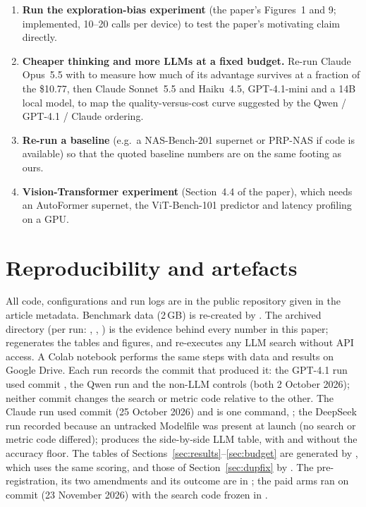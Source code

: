 \begin{enumerate}
  \item \textbf{Run the exploration-bias experiment} (the paper's Figures~1 and 9; implemented, 10--20 calls per device) to test the paper's motivating claim directly.
  \item \textbf{Cheaper thinking and more LLMs at a fixed budget.} Re-run Claude Opus~5.5 with  to measure how much of its advantage survives at a fraction of the \$10.77, then Claude Sonnet~5.5 and Haiku~4.5, GPT-4.1-mini and a 14B local model, to map the quality-versus-cost curve suggested by the Qwen / GPT-4.1 / Claude ordering.
  \item \textbf{Re-run a baseline} (e.g.\ a NAS-Bench-201 supernet or PRP-NAS if code is available) so that the quoted baseline numbers are on the same footing as ours.
  \item \textbf{Vision-Transformer experiment} (Section~4.4 of the paper), which needs an AutoFormer supernet, the ViT-Bench-101 predictor and latency profiling on a GPU.
\end{enumerate}

\section{Reproducibility and artefacts}
All code, configurations and run logs are in the public repository given in the article metadata. Benchmark data (2\,GB) is re-created by . The archived  directory (per run: , , ) is the evidence behind every number in this paper;  regenerates the tables and figures, and  re-executes any LLM search without API access. A Colab notebook performs the same steps with data and results on Google Drive. Each run records the commit that produced it: the GPT-4.1 run used commit , the Qwen run and the non-LLM controls  (both 2 October 2026); neither commit changes the search or metric code relative to the other. The Claude run used commit  (25 October 2026) and is one command, ; the DeepSeek run recorded  because an untracked Modelfile was present at launch (no search or metric code differed);  produces the side-by-side LLM table, with and without the accuracy floor. The tables of Sections~\ref{sec:results}--\ref{sec:budget} are generated by , which uses the same scoring, and those of Section~\ref{sec:dupfix} by . The pre-registration, its two amendments and its outcome are in ; the paid arms ran on commit  (23 November 2026) with the search code frozen in .

